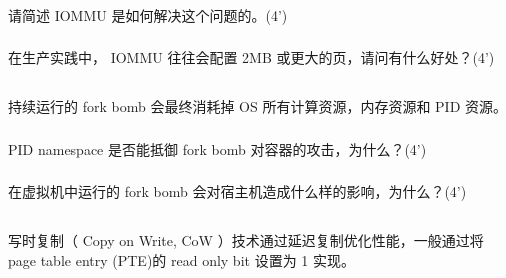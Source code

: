 \documentclass[a4paper,12pt]{article}
\newcommand{\score}[1]{(#1')}
\begin{document}
\subsubsection{}

请简述 IOMMU 是如何解决这个问题的。\score{4}

\begin{answer}
  \lipsum[3]
\end{answer}

\subsubsection{}

在生产实践中， IOMMU 往往会配置 2MB 或更大的页，请问有什么好处？\score{4}

\begin{answer}
  \lipsum[3]
\end{answer}

\subsection{}

持续运行的 fork bomb 会最终消耗掉 OS 所有计算资源，内存资源和 PID 资源。

\subsubsection{}

PID namespace 是否能抵御 fork bomb 对容器的攻击，为什么？\score{4}

\begin{answer}
  \lipsum[3]
\end{answer}

\subsubsection{}

在虚拟机中运行的 fork bomb 会对宿主机造成什么样的影响，为什么？\score{4}

\begin{answer}
  \lipsum[3]
\end{answer}

\subsection{}

写时复制（ Copy on Write, CoW ）技术通过延迟复制优化性能，一般通过将 page table entry (PTE)的 read only bit 设置为 1 实现。
\end{document}
